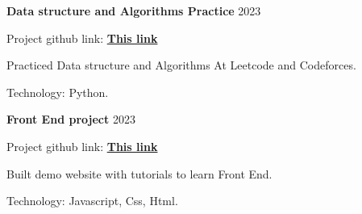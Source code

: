  \begin{cventries} %
 \cvsimpleentry
     {\textbf{Data structure and Algorithms Practice}} %
     {2023} %
     {
       \begin{cvitems} %
       \item {Project github link: \href{https://github.com/TrucNgoc11/DSA}{\textbf{This link}}}
         \item {Practiced Data structure and Algorithms At Leetcode and Codeforces.}
         \item {Technology: Python.}
       \end{cvitems}
     }

    \cvsimpleentry
     {\textbf{Front End project}} %
     {2023} %
     {
       \begin{cvitems} %
        \item {Project github link: \href{https://github.com/TrucNgoc11/Demo_Codegym}{\textbf{This link}}}
         \item {Built demo website with tutorials to learn Front End.}
         \item {Technology: Javascript, Css, Html.}
       \end{cvitems}
     }

\end{cventries}
